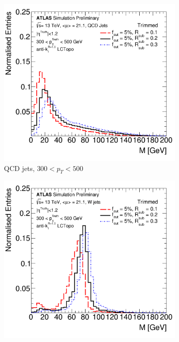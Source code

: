 \begin{figure}[htbp!]
  \centering
  \captionsetup{justification=centering}
    \begin{subfigure}[b]{0.4\textwidth}
        \includegraphics[width=\textwidth]{figures/object/trim_qcd_lowpt}
        \caption{QCD jets, $300 < p_{T} < 500$ \GeV}
        \label{fig:obj_trim_qcd_lowpt}
    \end{subfigure}
    \quad \quad 
    \begin{subfigure}[b]{0.4\textwidth}
        \includegraphics[width=\textwidth]{figures/object/trim_w_lowpt}

\end{subfigure}
\end{figure}

